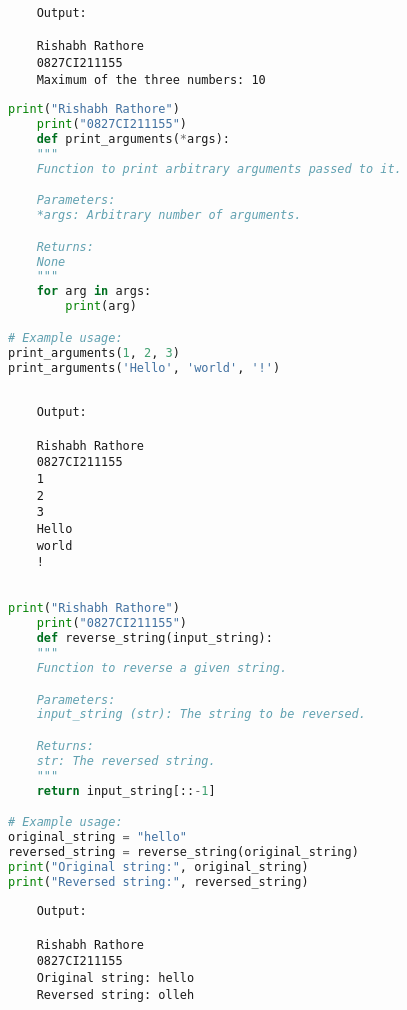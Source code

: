 \documentclass{report}
\begin{document}
\begin{verbatim}
	Output:

	Rishabh Rathore
	0827CI211155
	Maximum of the three numbers: 10

\end{verbatim}

\newpage


\sol 
\begin{lstlisting}[language=Python]
	print("Rishabh Rathore")
	print("0827CI211155")
	def print_arguments(*args):
    """
    Function to print arbitrary arguments passed to it.

    Parameters:
    *args: Arbitrary number of arguments.

    Returns:
    None
    """
    for arg in args:
        print(arg)

# Example usage:
print_arguments(1, 2, 3)
print_arguments('Hello', 'world', '!')
  

\end{lstlisting}

\begin{verbatim}
	Output:

	Rishabh Rathore
	0827CI211155
	1
	2
	3
	Hello
	world
	!
		

\end{verbatim}

\newpage


\sol 
\begin{lstlisting}[language=Python]
	print("Rishabh Rathore")
	print("0827CI211155")
	def reverse_string(input_string):
    """
    Function to reverse a given string.

    Parameters:
    input_string (str): The string to be reversed.

    Returns:
    str: The reversed string.
    """
    return input_string[::-1]

# Example usage:
original_string = "hello"
reversed_string = reverse_string(original_string)
print("Original string:", original_string)
print("Reversed string:", reversed_string)

\end{lstlisting}

\begin{verbatim}
	Output:

	Rishabh Rathore
	0827CI211155
	Original string: hello
	Reversed string: olleh

\end{verbatim}
\end{document}
